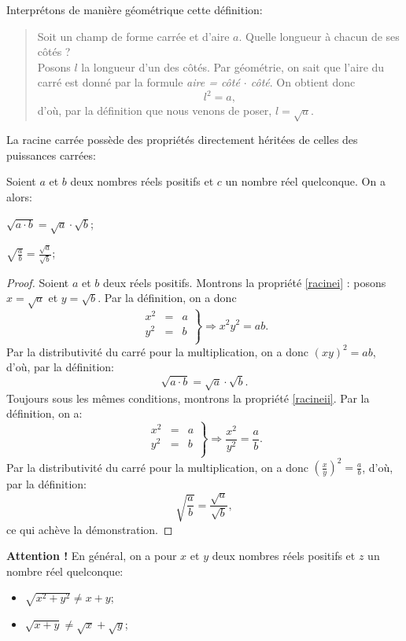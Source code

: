 Interprétons de manière géométrique cette définition: 
\begin{quotation}
Soit un champ de forme carrée et d'aire $a$. Quelle longueur à chacun de ses côtés ?\\
Posons $l$ la longueur d'un des côtés. Par géométrie, on sait que l'aire du carré est donné par la formule \emph{aire = côté $\cdot$ côté}. On obtient donc
$$
l^2 = a,
$$
d'où, par la définition que nous venons de poser, $l = \sqrt{a}$.
\end{quotation}

La racine carrée possède des propriétés directement héritées de celles des puissances carrées:

\begin{propriete}
Soient $a$ et $b$ deux nombres réels positifs et $c$ un nombre réel quelconque. On a alors:
\begin{indice}
	\item $\sqrt{a \cdot b} = \sqrt{a} \cdot \sqrt{b}$; \label{racinei}
	\item $\sqrt{\frac{a}{b}} = \frac{\sqrt{a}}{\sqrt{b}}$;\label{racineii}
\end{indice}
\end{propriete}

\begin{proof}
Soient $a$ et $b$ deux réels positifs. Montrons la propriété \ref{racinei} : posons $x = \sqrt{a}$ et $y = \sqrt{b}$. Par la définition, on a donc
$$
\left.
\begin{array}{lcr}
x^2 &=& a\\
y^2 &=& b\\
\end{array}
\right\} \Rightarrow x^2 y^2 = ab.
$$
Par la distributivité du carré pour la multiplication, on a donc $(xy)^2 = ab$, d'où, par la définition:
$$
\sqrt{a \cdot b} = \sqrt{a} \cdot \sqrt{b}.
$$
Toujours sous les mêmes conditions, montrons la propriété \ref{racineii}. Par la définition, on a:
$$
\left.
\begin{array}{lcr}
x^2 &=& a\\
y^2 &=& b\\
\end{array}
\right\} \Rightarrow \frac{x^2}{y^2} = \frac{a}{b}.
$$
Par la distributivité du carré pour la multiplication, on a donc $(\frac{x}{y})^2 = \frac{a}{b}$, d'où, par la définition:
$$
\sqrt{\frac{a}{b}} = \frac{\sqrt{a}}{\sqrt{b}},
$$
ce qui achève la démonstration.
\end{proof}

\begin{remarque}
\textbf{Attention !} En général, on a pour $x$ et $y$ deux nombres réels positifs et $z$ un nombre réel quelconque:
\begin{itemize}
	\item $\sqrt{x^2 + y^2} \neq x + y$;
	\item $\sqrt{x+y} \neq \sqrt{x} + \sqrt{y}$;
\end{itemize}
\end{remarque}

